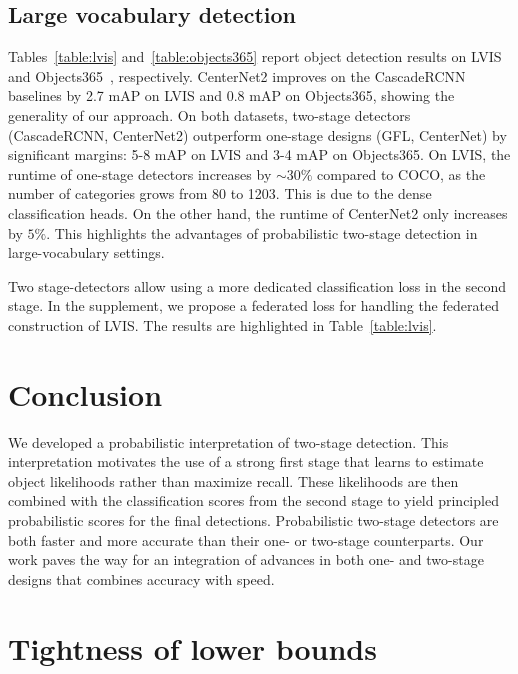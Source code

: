 \documentclass{article}
\newcommand{\name}{CenterNet2 }
\begin{document}
\subsection{Large vocabulary detection}
\label{sec:large_vocabulary}

Tables~\ref{table:lvis} and~\ref{table:objects365} report object detection results on LVIS~\cite{gupta2019lvis} and Objects365~\cite{shao2019objects365}, respectively.
CenterNet2 improves on the CascadeRCNN baselines by 2.7 mAP on LVIS and 0.8 mAP on Objects365, showing the generality of our approach.
On both datasets, two-stage detectors (CascadeRCNN, CenterNet2) outperform one-stage designs (GFL, CenterNet) by significant margins: 5-8 mAP on LVIS and 3-4 mAP on Objects365.  
On LVIS, the runtime of one-stage detectors increases by $\sim\!30\%$ compared to COCO, as the number of categories grows from 80 to 1203. This is due to the dense classification heads.
On the other hand, the runtime of \name only increases by $5\%$.
This highlights the advantages of probabilistic two-stage detection in large-vocabulary settings.

Two stage-detectors allow using a more dedicated classification loss in the second stage. In the supplement, we propose a federated loss for handling the federated construction of LVIS. The results are highlighted in Table~\ref{table:lvis}.

\section{Conclusion}

We developed a probabilistic interpretation of two-stage detection.
This interpretation motivates the use of a strong first stage that learns to estimate object likelihoods rather than maximize recall. 
These likelihoods are then combined with the classification scores from the second stage to yield principled probabilistic scores for the final detections.
Probabilistic two-stage detectors are both faster and more accurate than their one- or two-stage counterparts.
Our work paves the way for an integration of advances in both one- and two-stage designs
that combines accuracy with speed.


\nocite{langley00}




\normalsize
{}
\clearpage
\appendix


\section{Tightness of lower bounds}
\end{document}
